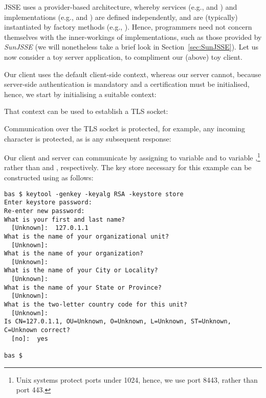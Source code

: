 

\noindent
JSSE uses a provider-based architecture, whereby services (e.g.,  and )
and implementations (e.g.,  and ) are defined independently, 
and are (typically) instantiated by factory methods (e.g., ). Hence, 
programmers need not concern themselves with the inner-workings of implementations, such as those provided 
by \emph{SunJSSE} (we will nonetheless take a brief look in Section~\ref{sec:SunJSSE}). 
Let us now consider a toy server application, to compliment our (above) toy client.

Our client uses the default client-side context, whereas our server cannot, because 
server-side authentication is mandatory and a certification must be initialised, 
hence, we start by initialising a suitable context:



\noindent
That context can be used to establish a TLS socket:



\noindent
Communication over the TLS socket is protected, for example, any incoming character is
protected, as is any subsequent response:



\noindent 
Our client and server can communicate by assigning  
to variable  and  to variable ,\footnote{Unix systems
  protect ports under 1024, hence, we use port 8443, rather than port 443.} 
rather than  and , respectively. The key 
store necessary for this example can be constructed using  as follows:

\begin{verbatim}
bas $ keytool -genkey -keyalg RSA -keystore store
Enter keystore password:  
Re-enter new password: 
What is your first and last name?
  [Unknown]:  127.0.1.1
What is the name of your organizational unit?
  [Unknown]:   
What is the name of your organization?
  [Unknown]:  
What is the name of your City or Locality?
  [Unknown]:  
What is the name of your State or Province?
  [Unknown]:  
What is the two-letter country code for this unit?
  [Unknown]:  
Is CN=127.0.1.1, OU=Unknown, O=Unknown, L=Unknown, ST=Unknown, C=Unknown correct?
  [no]:  yes

bas $
\end{verbatim}


